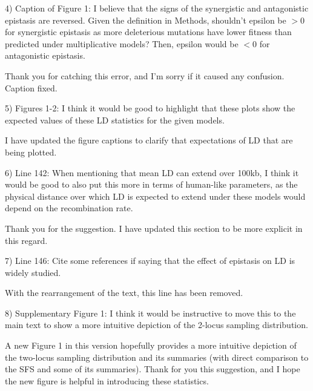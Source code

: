 \documentclass{article}
\newenvironment{response}%
  {\list{}{\leftmargin=0.5in\rightmargin=0.5in\color{blue}}\item[]}%
  {\endlist}
\begin{document}
4) Caption of Figure 1: I believe that the signs of the synergistic and
antagonistic epistasis are reversed. Given the definition in Methods, shouldn't
epsilon be $>0$ for synergistic epistasis as more deleterious mutations have
lower fitness than predicted under multiplicative models? Then, epsilon would
be $<0$ for antagonistic epistasis.

\begin{response}
    Thank you for catching this error, and I'm sorry if it caused any confusion.
    Caption fixed.
\end{response}

5) Figures 1-2: I think it would be good to highlight that these plots show the
expected values of these LD statistics for the given models.

\begin{response}
    I have updated the figure captions to clarify that
    expectations of LD that are being plotted.
\end{response}

6) Line 142: When mentioning that mean LD can extend over 100kb, I think it
would be good to also put this more in terms of human-like parameters, as the
physical distance over which LD is expected to extend under these models would
depend on the recombination rate.

\begin{response}
    Thank you for the suggestion. I have updated this section to be more explicit
    in this regard.
\end{response}

7) Line 146: Cite some references if saying that the effect of epistasis on LD
is widely studied.

\begin{response}
    With the rearrangement of the text, this line has been removed.
\end{response}

8) Supplementary Figure 1: I think it would be instructive to move this to the
main text to show a more intuitive depiction of the 2-locus sampling
distribution.

\begin{response}
    A new Figure 1 in this version hopefully provides a more intuitive depiction
    of the two-locus sampling distribution and its summaries (with direct comparison
    to the SFS and some of its summaries). Thank for you this suggestion, and I hope
    the new figure is helpful in introducing these statistics.
\end{response}
\end{document}
